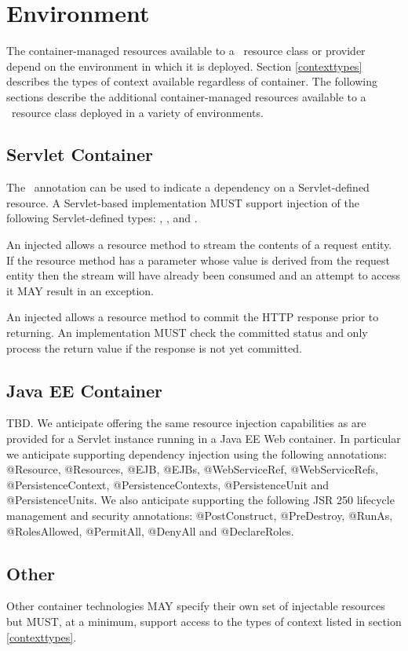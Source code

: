 \chapter{Environment}
\label{environment}

The container-managed resources available to a \jaxrs\ resource class or provider depend on the environment in which it is deployed. Section \ref{contexttypes} describes the types of context available regardless of container. The following sections describe the additional container-managed resources available to a \jaxrs\ resource class deployed in a variety of environments.

\section{Servlet Container}

The \Context\ annotation can be used to indicate a dependency on a Servlet-defined resource. A Servlet-based implementation MUST support injection of the following Servlet-defined types: , ,  and .

An injected  allows a resource method to stream the contents of a request entity. If the resource method has a parameter whose value is derived from the request entity then the stream will have already been consumed and an attempt to access it MAY result in an exception.

An injected  allows a resource method to commit the HTTP response prior to returning. An implementation MUST check the committed status and only process the return value if the response is not yet committed.

\section{Java EE Container}

\begin{ednote*}
TBD. We anticipate offering the same resource injection capabilities as are provided for a Servlet instance running in a Java EE Web container. In particular we anticipate supporting dependency injection using the following annotations: @Resource, @Resources, @EJB, @EJBs, @WebServiceRef, @WebServiceRefs, @PersistenceContext, @PersistenceContexts, @PersistenceUnit and @PersistenceUnits. We also anticipate supporting the following JSR 250 lifecycle management and security annotations:  @PostConstruct, @PreDestroy, @RunAs, @RolesAllowed, @PermitAll, @DenyAll and @DeclareRoles.
\end{ednote*}

\section{Other}

Other container technologies MAY specify their own set of injectable resources but MUST, at a minimum, support access to the types of context listed in section \ref{contexttypes}.